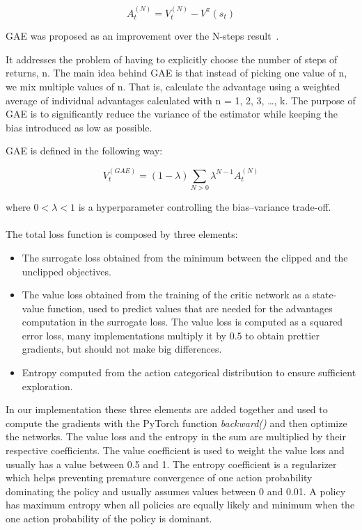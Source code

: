 \documentclass[11pt, a4paper, hidelinks]{report}
\begin{document}
\begin{equation}
	A_t^{(N)} = V_t^{(N)} - V^{\pi}(s_t)\label{eq:N-step-advantage}
\end{equation}

GAE was proposed as an improvement over the N-steps result~\citep{gae}.

\begin{quoting}[font=itshape, begintext={"}, endtext={"\citep{graesser2019foundations}}]
It addresses the problem of having to explicitly choose the number of steps of returns, n.
The main idea behind GAE is that instead of picking one value of n, we mix multiple values of n.
That is, calculate the advantage using a weighted average of individual advantages calculated with n = 1, 2, 3, \dots, k.
The purpose of GAE is to significantly reduce the variance of the estimator while keeping the bias introduced as low as possible.
\end{quoting}

GAE is defined in the following way:

\begin{equation}
	V_t^{(GAE)} = (1 - \lambda)\sum_{N > 0} \lambda^{N - 1}A_t^{(N)}\label{eq:GAE}
\end{equation}

where $0 < \lambda < 1$ is a hyperparameter controlling the bias–variance trade-off.
\\
\\
The total loss function is composed by three elements:
\begin{itemize}
	\item The surrogate loss obtained from the minimum between the clipped and the unclipped objectives.
	\item The value loss obtained from the training of the critic network as a state-value function, used to predict values that are needed for the advantages computation in the surrogate loss.
The value loss is computed as a squared error loss, many implementations multiply it by $0.5$ to obtain prettier gradients, but should not make big differences.
	\item Entropy computed from the action categorical distribution to ensure sufficient exploration.
\end{itemize}

In our implementation these three elements are added together and used to compute the gradients with the PyTorch function \textit{backward()} and then optimize the networks.
The value loss and the entropy in the sum are multiplied by their respective coefficients.
The value coefficient is used to weight the value loss and usually has a value between 0.5 and 1.
The entropy coefficient is a regularizer which helps preventing premature convergence of one action probability dominating the policy and usually assumes values between 0 and 0.01.
A policy has maximum entropy when all policies are equally likely and minimum when the one action probability of the policy is dominant.
\end{document}
